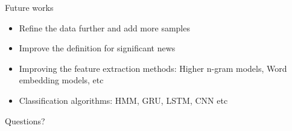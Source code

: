 \documentclass[12pt]{beamer}
\begin{document}
\begin{frame}{Future works}
    \begin{itemize}
        \item Refine the data further and add more samples
        \item Improve the definition for significant news
        \item Improving the feature extraction methods: Higher n-gram models, Word embedding models, etc
        \item Classification algorithms: HMM, GRU, LSTM, CNN etc
    \end{itemize}
\end{frame}

{
\begin{frame}[standout]
  Questions?
\end{frame}
}

\appendix

%     
\end{document}
